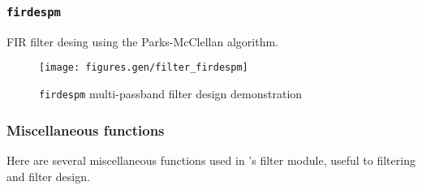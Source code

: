 \subsubsection{{\tt firdespm}}
\label{module:filter:firdespm}
FIR filter desing using the Parks-McClellan algorithm.




\begin{figure}
\centering
  \texttt{[image: figures.gen/filter\_firdespm]}
\caption{{\tt firdespm} multi-passband filter design demonstration}
\label{fig:module:filter:firdespm}
\end{figure}

\subsubsection{Miscellaneous functions}
\label{module:filter:misc}
Here are several miscellaneous functions used in \liquid's filter module,
useful to filtering and filter design.

